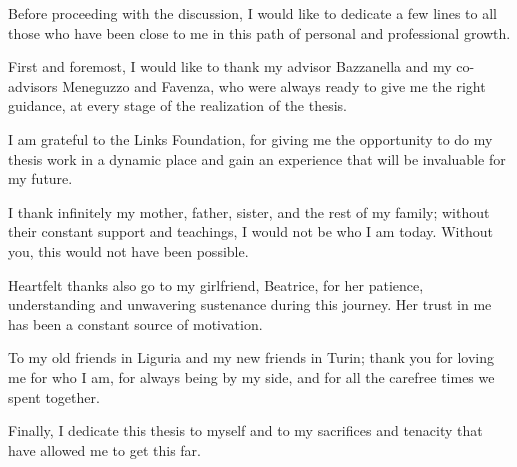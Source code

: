 \ringraziamenti

Before proceeding with the discussion, I would like to dedicate a few lines to all those who have been close to me in this path of personal and professional growth.

First and foremost, I would like to thank my advisor Bazzanella and my co-advisors Meneguzzo and Favenza, who were always ready to give me the right guidance, at every stage of the realization of the thesis. 

I am grateful to the Links Foundation, for giving me the opportunity to do my thesis work in a dynamic place and gain an experience that will be invaluable for my future. 

I thank infinitely my mother, father, sister, and the rest of my family; without their constant support and teachings, I would not be who I am today. Without you, this would not have been possible.

Heartfelt thanks also go to my girlfriend, Beatrice, for her patience, understanding and unwavering sustenance during this journey. Her trust in me has been a constant source of motivation.

To my old friends in Liguria and my new friends in Turin; thank you for loving me for who I am, for always being by my side, and for all the carefree times we spent together.

Finally, I dedicate this thesis to myself and to my sacrifices and tenacity that have allowed me to get this far.